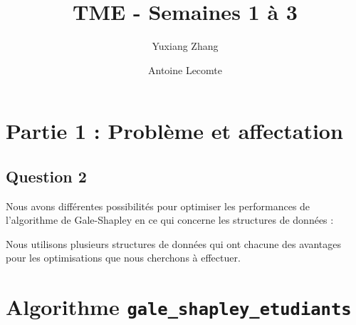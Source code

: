 \documentclass[a4paper,11pt]{article}
\title{TME - Semaines 1 à 3}
\author{Yuxiang Zhang \and Antoine Lecomte}
\date{}
\begin{document}
\maketitle

\section*{Partie 1 : Problème et affectation}

\subsection*{Question 2}

Nous avons différentes possibilités pour optimiser les performances de l'algorithme de Gale-Shapley en ce qui concerne les structures de données :

Nous utilisons plusieurs structures de données qui ont chacune des avantages pour les optimisations que nous cherchons à effectuer.

\section{Algorithme \texttt{gale\_shapley\_etudiants}}
\end{document}
